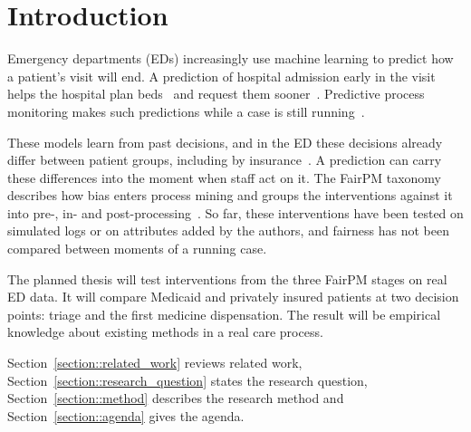 \section{Introduction}\label{section::introduction}

Emergency departments (EDs) increasingly use machine learning to predict how a patient's visit will end. A prediction of hospital admission early in the visit helps the hospital plan beds~\cite{king2022machine} and request them sooner~\cite{lett2025intersectional}. Predictive process monitoring makes such predictions while a case is still running~\cite{teinemaa2019outcome}.

These models learn from past decisions, and in the ED these decisions already differ between patient groups, including by insurance~\cite{venkatesh2019association,prucnal2025patterns}. A prediction can carry these differences into the moment when staff act on it. The FairPM taxonomy describes how bias enters process mining and groups the interventions against it into pre-, in- and post-processing~\cite{revoredo2026fairpm}. So far, these interventions have been tested on simulated logs or on attributes added by the authors, and fairness has not been compared between moments of a running case.

The planned thesis will test interventions from the three FairPM stages on real ED data. It will compare Medicaid and privately insured patients at two decision points: triage and the first medicine dispensation. The result will be empirical knowledge about existing methods in a real care process.

Section~\ref{section::related_work} reviews related work, Section~\ref{section::research_question} states the research question, Section~\ref{section::method} describes the research method and Section~\ref{section::agenda} gives the agenda.
